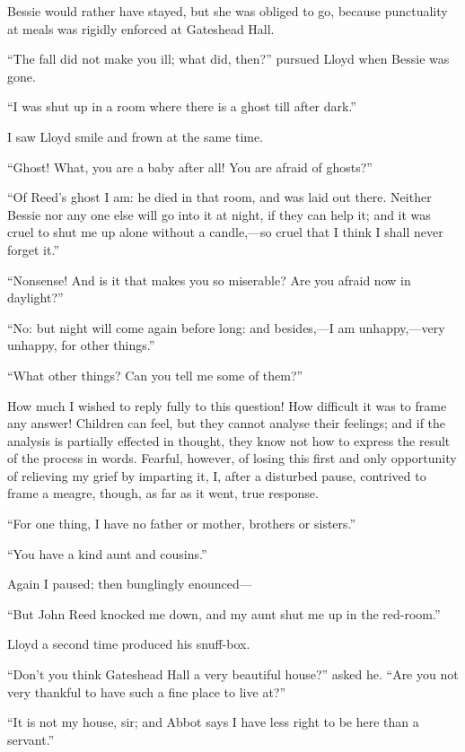 Bessie would rather have stayed, but she was obliged to go, because
punctuality at meals was rigidly enforced at Gateshead Hall.

\enquote{The fall did not make you ill; what did, then?} pursued \Mr{}
Lloyd when Bessie was gone.

\enquote{I was shut up in a room where there is a ghost till after
	dark.}

I saw \Mr{} Lloyd smile and frown at the same time.

\enquote{Ghost!  What, you are a baby after all!  You are afraid of
	ghosts?}

\enquote{Of \Mr{} Reed's ghost I am: he died in that room, and was laid
	out there.  Neither Bessie nor any one else will go into it at night, if
	they can help it; and it was cruel to shut me up alone without a
	candle,---so cruel that I think I shall never forget it.}

\enquote{Nonsense!  And is it that makes you so miserable?  Are you
	afraid now in daylight?}

\enquote{No: but night will come again before long: and besides,---I am
	unhappy,---very unhappy, for other things.}

\enquote{What other things?  Can you tell me some of them?}

How much I wished to reply fully to this question!  How difficult it was
to frame any answer!  Children can feel, but they cannot analyse their
feelings; and if the analysis is partially effected in thought, they
know not how to express the result of the process in words.  Fearful,
however, of losing this first and only opportunity of relieving my grief
by imparting it, I, after a disturbed pause, contrived to frame a
meagre, though, as far as it went, true response.

\enquote{For one thing, I have no father or mother, brothers or
	sisters.}

\enquote{You have a kind aunt and cousins.}

Again I paused; then bunglingly enounced---

\enquote{But John Reed knocked me down, and my aunt shut me up in the
	red-room.}

\Mr{} Lloyd a second time produced his snuff-box.

\enquote{Don't you think Gateshead Hall a very beautiful house?} asked
he.  \enquote{Are you not very thankful to have such a fine place to
	live at?}

\enquote{It is not my house, sir; and Abbot says I have less right to be
	here than a servant.}

